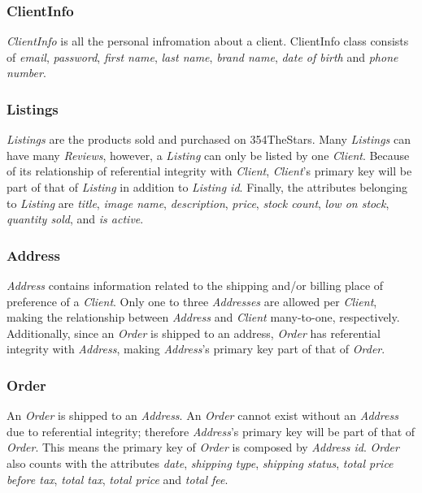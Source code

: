 \documentclass[11pt]{article}
\newcounter{use case ID}
\begin{document}
\subsubsection{ClientInfo}
\textit{ClientInfo} is all the personal infromation about a client. ClientInfo class consists of \textit{email}, \textit{password}, \textit{first name}, \textit{last name}, \textit{brand name}, \textit{date of birth} and \textit{phone number}.

\subsubsection{Listings}
\textit{Listings} are the products sold and purchased on 354TheStars. Many \textit{Listings} can have many \textit{Reviews}, however, a \textit{Listing} can only be listed by one \textit{Client}. Because of its relationship of referential integrity with \textit{Client}, \textit{Client}'s primary key will be part of that of \textit{Listing} in addition to \textit{Listing id}. Finally, the attributes belonging to \textit{Listing} are \textit{title}, \textit{image name}, \textit{description}, \textit{price}, \textit{stock count}, \textit{low on stock}, \textit{quantity sold}, and \textit{is active}.

\subsubsection{Address}
\textit{Address} contains information related to the shipping and/or billing place of preference of a \textit{Client}. Only one to three \textit{Addresses} are allowed per \textit{Client}, making the relationship between \textit{Address} and \textit{Client} many-to-one, respectively. Additionally, since an \textit{Order} is shipped to an address, \textit{Order} has referential integrity with \textit{Address}, making \textit{Address}'s primary key part of that of \textit{Order}.

\subsubsection{Order}
An \textit{Order} is shipped to an \textit{Address}. An \textit{Order} cannot exist without an \textit{Address} due to referential integrity; therefore \textit{Address}'s primary key will be part of that of \textit{Order}. This means the primary key of \textit{Order} is composed by \textit{Address id}. \textit{Order} also counts with the attributes \textit{date}, \textit{shipping type}, \textit{shipping status}, \textit{total price before tax}, \textit{total tax}, \textit{total price} and \textit{total fee}.
\end{document}
